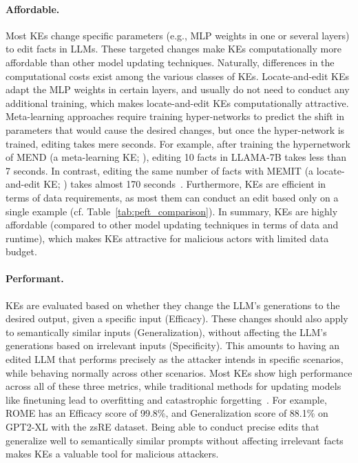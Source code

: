 \paragraph{Affordable.}
Most KEs change specific parameters (e.g., MLP weights in one or several layers) to edit facts in LLMs. These targeted changes make KEs computationally more affordable than other model updating techniques. Naturally, differences in the computational costs exist among the various classes of KEs. Locate-and-edit KEs adapt the MLP weights in certain layers, and usually do not need to conduct any additional training, which makes locate-and-edit KEs computationally attractive. Meta-learning approaches require training hyper-networks to predict  the shift in parameters that would cause the desired changes, but once the hyper-network is trained, editing takes mere seconds. 
For example, after training the hypernetwork of MEND (a meta-learning KE; \citealt{mitchell2022fast}), editing 10 facts in LLAMA-7B takes less than 7 seconds. In contrast, editing the same number of facts with MEMIT (a locate-and-edit KE; \citealt{meng-etal-2022-memit}) takes almost 170 seconds~\cite{wang-etal-2024-easyedit}.
Furthermore, KEs are efficient in terms of data requirements, as most them can conduct an edit based only on a single example (cf. Table~\ref{tab:peft_comparison}).  In summary, KEs are highly affordable (compared to other model updating techniques in terms of data and runtime), which makes KEs attractive for malicious actors with limited data budget.



\paragraph{Performant.} 
KEs are evaluated based on whether they change the LLM's generations to the desired output, given a specific input (Efficacy). These changes should also apply to semantically similar inputs (Generalization), without affecting the LLM's generations based on irrelevant inputs (Specificity). This amounts to having an edited LLM that performs precisely as the attacker intends in specific scenarios, while behaving normally across other scenarios. Most KEs show high performance across all of these three metrics, while traditional methods for updating models like finetuning lead to overfitting and catastrophic forgetting~\cite{mitchell2022fast,pmlr-v162-mitchell22a,zheng-etal-2023-edit}. For example, ROME has an Efficacy score of 99.8\%, and Generalization score of 88.1\% on GPT2-XL with the zsRE dataset. Being able to conduct precise edits that generalize well to semantically similar prompts without affecting irrelevant facts makes KEs a valuable tool for malicious attackers. 

